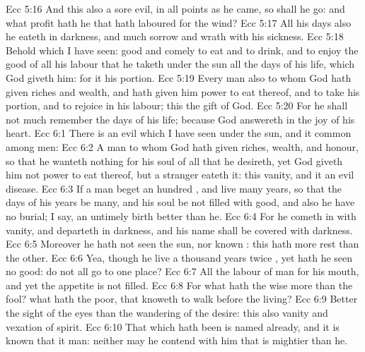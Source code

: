 \vs Ecc 5:16 And this also  a sore evil,  in all points as he came, so shall he go: and what profit hath he that hath laboured for the wind?
\vs Ecc 5:17 All his days also he eateth in darkness, and  much sorrow and wrath with his sickness.
\vs Ecc 5:18 Behold  which I have seen:  good and comely  to eat and to drink, and to enjoy the good of all his labour that he taketh under the sun all the days of his life, which God giveth him: for it  his portion.
\vs Ecc 5:19 Every man also to whom God hath given riches and wealth, and hath given him power to eat thereof, and to take his portion, and to rejoice in his labour; this  the gift of God.
\vs Ecc 5:20 For he shall not much remember the days of his life; because God answereth  in the joy of his heart.
\vs Ecc 6:1 There is an evil which I have seen under the sun, and it  common among men:
\vs Ecc 6:2 A man to whom God hath given riches, wealth, and honour, so that he wanteth nothing for his soul of all that he desireth, yet God giveth him not power to eat thereof, but a stranger eateth it: this  vanity, and it  an evil disease.
\vs Ecc 6:3 If a man beget an hundred , and live many years, so that the days of his years be many, and his soul be not filled with good, and also  he have no burial; I say,  an untimely birth  better than he.
\vs Ecc 6:4 For he cometh in with vanity, and departeth in darkness, and his name shall be covered with darkness.
\vs Ecc 6:5 Moreover he hath not seen the sun, nor known : this hath more rest than the other.
\vs Ecc 6:6 Yea, though he live a thousand years twice , yet hath he seen no good: do not all go to one place?
\vs Ecc 6:7 All the labour of man  for his mouth, and yet the appetite is not filled.
\vs Ecc 6:8 For what hath the wise more than the fool? what hath the poor, that knoweth to walk before the living?
\vs Ecc 6:9 Better  the sight of the eyes than the wandering of the desire: this  also vanity and vexation of spirit.
\vs Ecc 6:10 That which hath been is named already, and it is known that it  man: neither may he contend with him that is mightier than he.

